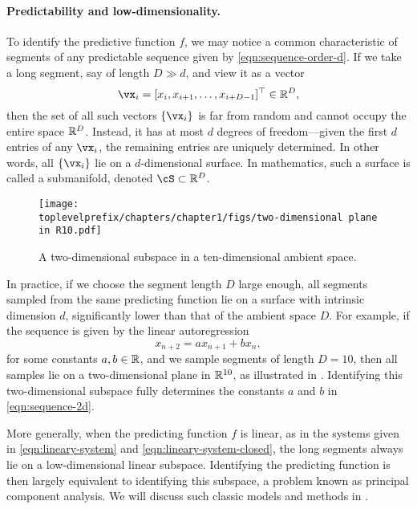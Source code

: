 \documentclass[../../book-main.tex]{subfiles}
\begin{document}
\paragraph{Predictability and low-dimensionality.}
To identify the predictive function \(f\), we may notice a common characteristic of segments of any predictable sequence given by \eqref{eqn:sequence-order-d}. If we take a long segment, say of length \(D \gg d\), and view it as a vector
\begin{equation}
    \vx_{i} = [x_{i}, x_{i+1}, \ldots, x_{i+D-1}]^{\top} \in \R^{D},
    \label{eqn:segment-vector}
\end{equation}
then the set of all such vectors \(\{\vx_{i}\}\) is far from random and cannot occupy the entire space \(\mathbb{R}^{D}\). Instead, it has at most \(d\) degrees of freedom---given the first \(d\) entries of any \(\vx_{i}\), the remaining entries are uniquely determined. In other words, all \(\{\vx_{i}\}\) lie on a \(d\)-dimensional surface. In mathematics, such a surface is called a submanifold, denoted \(\cS \subset \R^{D}\).

\begin{figure}[t]
\centering
\texttt{[image: \\toplevelprefix/chapters/chapter1/figs/two-dimensional plane in R10.pdf]}
    \caption{A two-dimensional subspace in a ten-dimensional ambient space.}
    \label{fig:lowdimplane}
\end{figure}
In practice, if we choose the segment length \(D\) large enough, all segments sampled from the same predicting function lie on a surface with intrinsic dimension \(d\), significantly lower than that of the ambient space \(D\). For example, if the sequence is given by the linear autoregression
\begin{equation}
    x_{n+2} = a x_{n+1} + b x_{n},
    \label{eqn:sequence-2d}
\end{equation}
for some constants \(a, b \in \mathbb{R}\), and we sample segments of length \(D = 10\), then all samples lie on a two-dimensional plane in \(\mathbb{R}^{10}\), as illustrated in . Identifying this two-dimensional subspace fully determines the constants \(a\) and \(b\) in \eqref{eqn:sequence-2d}.

More generally, when the predicting function \(f\) is linear, as in the systems given in \eqref{eqn:lineary-system} and \eqref{eqn:lineary-system-closed}, the long segments always lie on a low-dimensional linear subspace. Identifying the predicting function is then largely equivalent to identifying this subspace, a problem known as principal component analysis. We will discuss such classic models and methods in .
\end{document}
